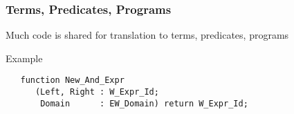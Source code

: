 \documentclass{beamer}
\newcommand{\vs}{\vspace{0.5cm}}
\newenvironment{specialframe}{%
  \begin{frame}[fragile,environment=specialframe]}{\end{frame}}
\begin{document}
\begin{specialframe}\frametitle{Terms, Predicates, Programs}

   Much code is shared for translation to terms, predicates, programs

   \vs
   \begin{block}{Example}
      \begin{verbatim}
   function New_And_Expr
      (Left, Right : W_Expr_Id;
       Domain      : EW_Domain) return W_Expr_Id;
       \end{verbatim}
    \end{block}
\end{specialframe}
\end{document}
